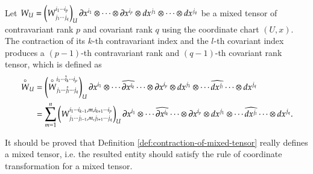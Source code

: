 \documentclass[11pt, a4paper]{book}
\begin{document}
\begin{Definition}
  \label{def:contraction-of-mixed-tensor}
  Let
  $W_U = \left( W^{i_1 \cdots i_p}_{j_1 \cdots j_q} \right)_U \boldsymbol{\partial}x^{i_1} \otimes
  \cdots \otimes \boldsymbol{\partial}x^{i_p} \otimes dx^{j_1} \otimes \cdots \otimes dx^{j_q}$ be
  a mixed tensor of contravariant rank $p$ and covariant rank $q$ using the coordinate
  chart $(U,x)$. The contraction of its $k$-th contravariant index and the $l$-th
  covariant index produces a $(p-1)$-th contravariant rank and $(q-1)$-th covariant rank
  tensor, which is defined as
  \begin{equation}
    \label{eq:contraction-of-mixed-tensor}
    \begin{aligned}
      \overset{\circ}{W}_U &= \left( \overset{\circ}{W}^{i_1 \cdots \hat{i}_k \cdots
          i_p}_{j_1 \cdots \hat{j}_l \cdots j_q} \right)_U \boldsymbol{\partial}x^{i_1} \otimes
      \cdots \widehat{\boldsymbol{\partial}x^{i_k}} \cdots \otimes \boldsymbol{\partial}x^{i_p} \otimes
      dx^{j_1}  \otimes \cdots \widehat{dx^{j_l}} \cdots \otimes dx^{j_q} \\
      &= \sum_{m=1}^n \left( W^{i_1 \cdots i_{k-1}, m, i_{k+1} \cdots i_p}_{j_1 \cdots
          j_{l-1}, m, j_{l+1} \cdots j_{q}} \right)_U \boldsymbol{\partial}x^{i_1} \otimes \cdots
      \widehat{\boldsymbol{\partial}x^{i_k}} \cdots \otimes \boldsymbol{\partial}x^{i_p} \otimes dx^{j_1}
      \otimes \cdots \widehat{dx^{j_l}} \cdots \otimes dx^{j_q}.
    \end{aligned}
  \end{equation}
\end{Definition}
It should be proved that Definition \ref{def:contraction-of-mixed-tensor} really defines
a mixed tensor, i.e. the resulted entity should satisfy the rule of coordinate
transformation for a mixed tensor.
\end{document}
